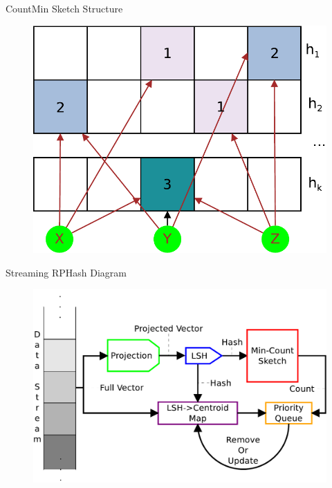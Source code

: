\documentclass[12pt]{beamer}
\begin{document}
\begin{frame}[plain]{CountMin Sketch Structure}
    \begin{center}
      \begin{figure}
	\centerline{\includegraphics[width=.65\textwidth]{figs/countmin}}
      \end{figure}
    \end{center}
    \end{frame}

\begin{frame}[plain]{Streaming RPHash Diagram}
 \begin{figure}
 \centerline{\includegraphics[width=.7\textwidth]{figs/rphashoverview}}
\end{figure}
\end{frame}
\end{document}
